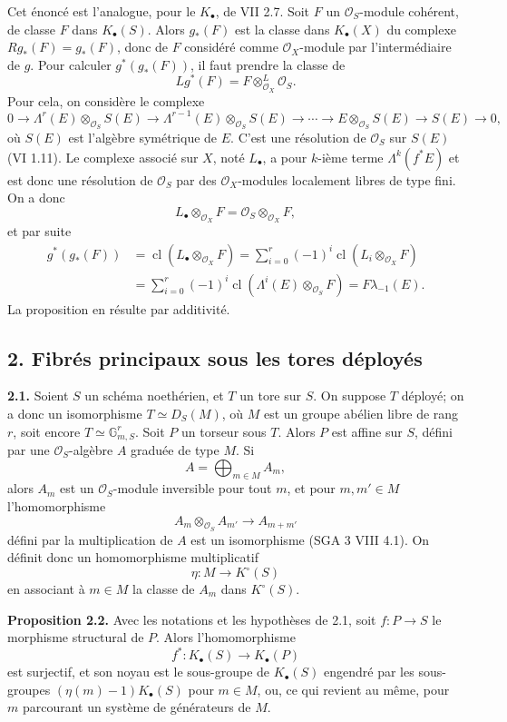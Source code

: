 \documentclass[11pt]{article}
\newcommand{\cl}{\operatorname{cl}}
\begin{document}
Cet énoncé est l'analogue, pour le $K_\bullet$, de VII 2.7. Soit $F$ un $\mathcal O_S$-module cohérent, de classe $F$ dans $K_\bullet(S)$. Alors $g_*(F)$ est la classe dans $K_\bullet(X)$ du complexe $Rg_*(F)=g_*(F)$, donc de $F$ considéré comme $\mathcal O_X$-module par l'intermédiaire de $g$. Pour calculer $g^*(g_*(F))$, il faut prendre la classe de
\[
Lg^*(F)=F\otimes^L_{\mathcal O_X}\mathcal O_S.
\]
Pour cela, on considère le complexe
\[
0\longrightarrow \Lambda^r(E)\otimes_{\mathcal O_S}S(E)\longrightarrow
\Lambda^{r-1}(E)\otimes_{\mathcal O_S}S(E)\longrightarrow\cdots\longrightarrow
E\otimes_{\mathcal O_S}S(E)\longrightarrow S(E)\longrightarrow 0,
\]
où $S(E)$ est l'algèbre symétrique de $E$. C'est une résolution de $\mathcal O_S$ sur $S(E)$ (VI 1.11). Le complexe associé sur $X$, noté $L_\bullet$, a pour $k$-ième terme $\Lambda^k(f^*E)$ et est donc une résolution de $\mathcal O_S$ par des $\mathcal O_X$-modules localement libres de type fini. On a donc
\[
L_\bullet\otimes_{\mathcal O_X}F=\mathcal O_S\otimes_{\mathcal O_X}F,
\]
et par suite
\[
\begin{aligned}
g^*(g_*(F))
&=\cl(L_\bullet\otimes_{\mathcal O_X}F)
=\sum_{i=0}^r(-1)^i\cl(L_i\otimes_{\mathcal O_X}F)\\
&=\sum_{i=0}^r(-1)^i\cl(\Lambda^i(E)\otimes_{\mathcal O_S}F)
=F\lambda_{-1}(E).
\end{aligned}
\]
La proposition en résulte par additivité.

\subsection*{2. Fibrés principaux sous les tores déployés}

\textbf{2.1.} Soient $S$ un schéma noethérien, et $T$ un tore sur $S$. On suppose $T$ déployé; on a donc un isomorphisme $T\simeq D_S(M)$, où $M$ est un groupe abélien libre de rang $r$, soit encore $T\simeq \mathbb G_{m,S}^r$. Soit $P$ un torseur sous $T$. Alors $P$ est affine sur $S$, défini par une $\mathcal O_S$-algèbre $A$ graduée de type $M$. Si
\[
A=\bigoplus_{m\in M}A_m,
\]
alors $A_m$ est un $\mathcal O_S$-module inversible pour tout $m$, et pour $m,m'\in M$ l'homomorphisme
\[
A_m\otimes_{\mathcal O_S}A_{m'}\longrightarrow A_{m+m'}
\]
défini par la multiplication de $A$ est un isomorphisme (SGA 3 VIII 4.1). On définit donc un homomorphisme multiplicatif
\[
\eta:M\longrightarrow K^\circ(S)
\]
en associant à $m\in M$ la classe de $A_m$ dans $K^\circ(S)$.

\textbf{Proposition 2.2.} Avec les notations et les hypothèses de 2.1, soit $f:P\to S$ le morphisme structural de $P$. Alors l'homomorphisme
\[
f^*:K_\bullet(S)\longrightarrow K_\bullet(P)
\]
est surjectif, et son noyau est le sous-groupe de $K_\bullet(S)$ engendré par les sous-groupes $(\eta(m)-1)K_\bullet(S)$ pour $m\in M$, ou, ce qui revient au même, pour $m$ parcourant un système de générateurs de $M$.
\end{document}
